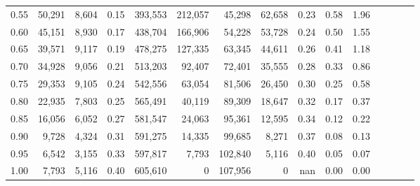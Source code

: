 \begin{tabular}{rrrcrrrrrrrrrrr}
0.55 &  50,291 &  8,604 &                                       0.15 &  393,553 &  212,057 &   45,298 &   62,658 &  0.23 &  0.58 &                         1.96 \\
0.60 &  45,151 &  8,930 &                                       0.17 &  438,704 &  166,906 &   54,228 &   53,728 &  0.24 &  0.50 &                         1.55 \\
0.65 &  39,571 &  9,117 &                                       0.19 &  478,275 &  127,335 &   63,345 &   44,611 &  0.26 &  0.41 &                         1.18 \\
0.70 &  34,928 &  9,056 &                                       0.21 &  513,203 &   92,407 &   72,401 &   35,555 &  0.28 &  0.33 &                         0.86 \\
0.75 &  29,353 &  9,105 &                                       0.24 &  542,556 &   63,054 &   81,506 &   26,450 &  0.30 &  0.25 &                         0.58 \\
0.80 &  22,935 &  7,803 &                                       0.25 &  565,491 &   40,119 &   89,309 &   18,647 &  0.32 &  0.17 &                         0.37 \\
0.85 &  16,056 &  6,052 &                                       0.27 &  581,547 &   24,063 &   95,361 &   12,595 &  0.34 &  0.12 &                         0.22 \\
0.90 &   9,728 &  4,324 &                                       0.31 &  591,275 &   14,335 &   99,685 &    8,271 &  0.37 &  0.08 &                         0.13 \\
0.95 &   6,542 &  3,155 &                                       0.33 &  597,817 &    7,793 &  102,840 &    5,116 &  0.40 &  0.05 &                         0.07 \\
1.00 &   7,793 &  5,116 &                                       0.40 &  605,610 &        0 &  107,956 &        0 &   nan &  0.00 &                         0.00 \\
\bottomrule
\end{tabular}
